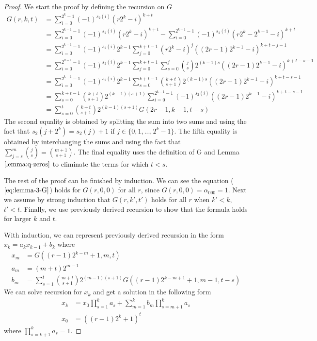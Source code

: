 \documentclass{article}
\begin{document}
\begin{proof}
We start the proof by defining the recursion on $G$
\begin{align*}
G(r, k, t) &= \sum_{i=0}^{2^k-1} (-1)^{s_2(i)}\left(r2^{k}-i\right)^{k+t} \\
    &= \sum_{i=0}^{2^{k-1}-1} (-1)^{s_2(i)}\left(r2^{k}-i\right)^{k+t} - \sum_{i=0}^{2^{k-1}-1} (-1)^{s_2(i)}\left(r2^{k}-2^{k-1}-i\right)^{k+t} \\
    &= \sum_{i=0}^{2^{k-1}-1} (-1)^{s_2(i)}2^{k-1}\sum_{j=0}^{k+t-1} (r2^{k}-i)^j((2r-1)2^{k-1}-i)^{k+t-j-1} \\
    &= \sum_{i=0}^{2^{k-1}-1} (-1)^{s_2(i)}2^{k-1}\sum_{j=0}^{k+t-1} \sum_{s=0}^{j}\binom{j}{s}2^{(k-1)s}((2r-1)2^{k-1}-i)^{k+t-s-1} \\
    &= \sum_{i=0}^{2^{k-1}-1} (-1)^{s_2(i)}2^{k-1} \sum_{s=0}^{k+t-1}\binom{k+t}{s+1}2^{(k-1)s}((2r-1)2^{k-1}-i)^{k+t-s-1} \\
    &= \sum_{s=0}^{k+t-1}\binom{k+t}{s+1}2^{(k-1)(s+1)}\sum_{i=0}^{2^{k-1}-1} (-1)^{s_2(i)}((2r-1)2^{k-1}-i)^{k+t-s-1} \\
    &= \sum_{s=0}^{t}\binom{k+t}{s+1}2^{(k-1)(s+1)} G(2r-1, k-1,t-s)
\end{align*}
The second equality is obtained by splitting the sum into two sums and using the fact that $s_2(j+2^{k}) = s_2(j)+1$ if $j \in \{0, 1, ..., 2^k-1\}$. The fifth equality is obtained by interchanging the sums and using the fact that $\sum_{j=s}^{m} \binom{j}{s}=\binom{m+1}{s+1}$. The final equality uses the definition of G and Lemma $\ref{lemma:q-zeros}$ to eliminate the terms for which $t < s$.

The rest of the proof can be finished by induction. We can see the equation ($\ref{eq:lemma-3-G}$) holds for $G(r, 0, 0)$ for all $r$, since $G(r, 0, 0)=\alpha_{000}=1$. Next we assume by strong induction that $G(r, k', t')$ holds for all $r$ when $k' < k$, $t' < t$. Finally, we use previously derived recursion to show that the formula holds for larger $k$ and $t$.

With induction, we can represent previously derived recursion in the form $x_k = a_k x_{k-1} + b_{k}$ where
\begin{align*}
x_{m} &= G((r-1)2^{k-m}+1, m, t) \\
a_m &= (m+t)2^{m-1} \\
b_m &= \sum_{s=1}^{t}\binom{m+t}{s+1}2^{(m-1)(s+1)} G((r-1)2^{k-m+1}+1, m-1,t-s)
\end{align*}
We can solve recursion for $x_k$ and get a solution in the following form
\begin{align*}
x_k &= x_0 \prod_{s=1}^{k} a_s + \sum_{m=1}^{k} b_{m} \prod_{s=m+1}^{k}a_s \\
x_0 &= ((r-1)2^k+1)^t
\end{align*}
where $\prod_{s=k+1}^{k}a_s = 1$.


\end{proof}
\end{document}
